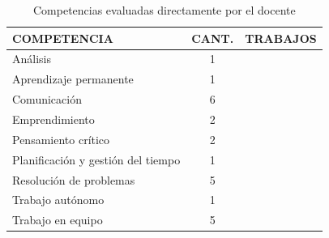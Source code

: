 \begin{table}
  \begin{center}
  \begin{tabular}{| m{6cm} | c | m{5cm} |}
    \hline
    COMPETENCIA & CANT. & TRABAJOS\\
    \hline
    \hline
    Análisis & 1 & \cite{aziz2007appraisal} \\
    \hline
    Aprendizaje permanente & 1 & \cite{rashid2008engineering} \\
    \hline
    Comunicación & 6 &  \cite{lacuesta2009active,martin2013acquired,rodriguez2010portfolio,benlloch2007adapting,yang2014fine,rashid2008engineering} \\
    \hline
    Emprendimiento & 2 & \cite{ward2011developing,rashid2008engineering} \\
    \hline
    Pensamiento crítico & 2 & \cite{lacuesta2009active,aziz2007appraisal} \\
    \hline
    Planificación y gestión del tiempo & 1 & \cite{lacuesta2009active} \\
    \hline
    Resolución de problemas & 5 & \cite{martin2013acquired,rodriguez2010portfolio,benlloch2007adapting,vizcarro2013assessment,aziz2007appraisal} \\
    \hline
    Trabajo autónomo & 1 &  \cite{lasa2013problem} \\
    \hline
    Trabajo en equipo & 5 &  \cite{lacuesta2009active,martin2013acquired,rodriguez2010portfolio,benlloch2007adapting,rashid2008engineering} \\
    \hline
  \end{tabular}
\end{center}
\caption{Competencias evaluadas directamente por el docente}
\label{tab:CompetenciasProfesor}
\end{table}
 
